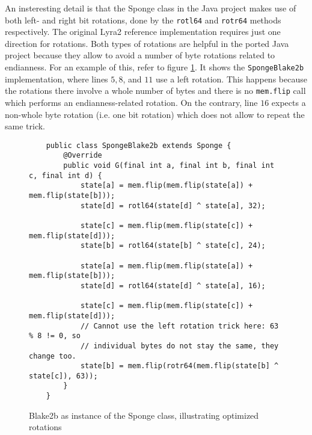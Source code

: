 An insteresting detail is that the Sponge class in the Java project makes use of both left- and right bit rotations, done by the \texttt{rotl64} and \texttt{rotr64} methods respectively. The original Lyra2 reference implementation requires just one direction for rotations. Both types of rotations are helpful in the ported Java project because they allow to avoid a number of byte rotations related to endianness. For an example of this,  refer to figure \ref{fig:sponge-blake2b}. It shows the \texttt{SpongeBlake2b} implementation, where lines \(5, 8\), and \(11\) use a left rotation. This happens because the rotations there involve a whole number of bytes and there is no \texttt{mem.flip} call which performs an endianness-related rotation. On the contrary, line \(16\) expects a non-whole byte rotation (i.e. one bit rotation) which does not allow to repeat the same trick.


\begin{figure}
\small
\begin{verbatim}
    public class SpongeBlake2b extends Sponge {
        @Override
        public void G(final int a, final int b, final int c, final int d) {
            state[a] = mem.flip(mem.flip(state[a]) + mem.flip(state[b]));
            state[d] = rotl64(state[d] ^ state[a], 32);

            state[c] = mem.flip(mem.flip(state[c]) + mem.flip(state[d]));
            state[b] = rotl64(state[b] ^ state[c], 24);

            state[a] = mem.flip(mem.flip(state[a]) + mem.flip(state[b]));
            state[d] = rotl64(state[d] ^ state[a], 16);

            state[c] = mem.flip(mem.flip(state[c]) + mem.flip(state[d]));
            // Cannot use the left rotation trick here: 63 % 8 != 0, so
            // individual bytes do not stay the same, they change too.
            state[b] = mem.flip(rotr64(mem.flip(state[b] ^ state[c]), 63));
        }
    }
\end{verbatim}
\normalsize
\caption{Blake2b as instance of the Sponge class, illustrating optimized rotations}
\label{fig:sponge-blake2b}
\end{figure}
